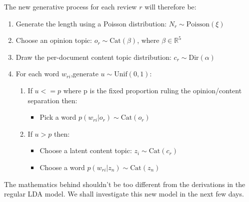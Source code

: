 \documentclass[paper=a4, fontsize=11pt]{scrartcl} %
\numberwithin{equation}{section}
\numberwithin{figure}{section}
\numberwithin{table}{section}
\begin{document}
The new generative process for each review $r$ will therefore be:
\begin{enumerate}
\item Generate the length using a Poisson distribution: $N_r \sim \text{Poisson}(\xi)$
\item Choose an opinion topic: $o_r \sim \text{Cat}(\beta)$, where $\beta \in \mathbb{R}^5$ 
\item Draw the per-document content topic distribution: $c_r\sim \text{Dir}(\alpha)$
\item For each word $w_{ri}$,\quad generate $u \sim \text{Unif}(0,1)$:
	\begin{enumerate}
	\item If $u<=p$ where p is the fixed proportion ruling the opinion/content separation then:
		\begin{itemize}
		\item Pick a word $p(w_{ri} | o_r) \sim \text{Cat}(o_r)$
		\end{itemize}
	\item If $u>p$ then:
		\begin{itemize}
		\item Choose a latent content topic: $z_i \sim \text{Cat}(c_r)$
		\item Choose a word $p(w_{ri} | z_n) \sim \text{Cat}(z_n)$
		\end{itemize}
	\end{enumerate}
\end{enumerate}
The mathematics behind shouldn't be too different from the derivations in the regular LDA model. We shall investigate this new model in the next few days.
\end{document}
